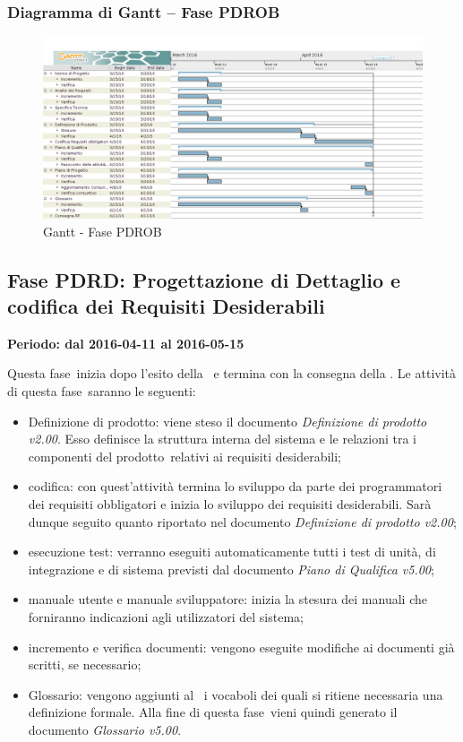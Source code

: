 \documentclass[../PianoProgetto.tex]{subfiles}
\begin{document}
		\subsubsection{Diagramma di Gantt – Fase PDROB}
			\begin{figure}[!h]
				\centering
				\includegraphics[width=\textwidth]{gantt_png/4-requisiti_obbligatori}
				\caption{Gantt - Fase PDROB}
				\label{fig:Gantt - Fase PDROB}
			\end{figure}
\newpage
	\subsection{Fase PDRD: Progettazione di Dettaglio e codifica dei Requisiti Desiderabili}
		\textbf{Periodo: dal 2016-04-11 al 2016-05-15}
		
		Questa fase\g\ inizia dopo l'esito della \revisionediprogettazione\ e termina con la consegna della \revisionediqualifica. Le attività di questa fase\g\ saranno le seguenti:

		\begin{itemize}
			\item Definizione di prodotto: viene steso il documento \textit{Definizione di prodotto v2.00}. Esso definisce la struttura interna del sistema e le relazioni tra i componenti del prodotto\g\ relativi ai requisiti desiderabili;

			\item codifica: con quest'attività termina lo sviluppo da parte dei programmatori dei requisiti obbligatori e inizia lo sviluppo dei requisiti desiderabili. Sarà dunque seguito quanto riportato nel documento \textit{Definizione di prodotto v2.00};

	 		\item esecuzione test: verranno eseguiti automaticamente tutti i test di unità, di integrazione e di sistema previsti dal documento \textit{Piano di Qualifica v5.00};

			\item manuale utente e manuale sviluppatore: inizia la stesura dei manuali che forniranno indicazioni agli utilizzatori del sistema;

			\item incremento e verifica documenti: vengono eseguite modifiche ai documenti già scritti, se necessario;

			\item Glossario: vengono aggiunti al \glossario\ i vocaboli dei quali si ritiene necessaria una definizione formale. Alla fine di questa fase\g\ vieni quindi generato il documento \textit{Glossario v5.00}.
		\end{itemize}
		\newpage
\end{document}
